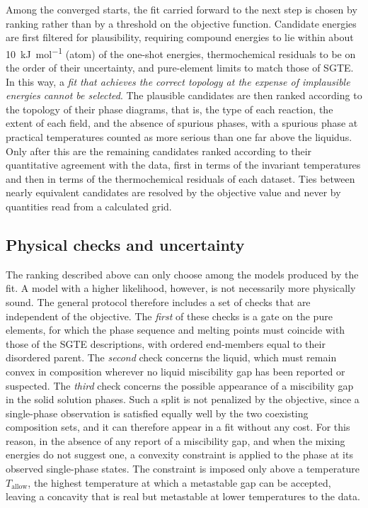 Among the converged starts, the fit carried forward to the next step is chosen by ranking rather than by a threshold on the objective function. Candidate energies are first filtered for plausibility, requiring compound energies to lie within about \qty{10}{\kilo\joule\per\mole} (atom) of the one-shot energies, thermochemical residuals to be on the order of their uncertainty, and pure-element limits to match those of SGTE. In this way, a \emph{fit that achieves the correct topology at the expense of implausible energies cannot be selected}. The plausible candidates are then ranked according to the topology of their phase diagrams, that is, the type of each reaction, the extent of each field, and the absence of spurious phases, with a spurious phase at practical temperatures counted as more serious than one far above the liquidus. Only after this are the remaining candidates ranked according to their quantitative agreement with the data, first in terms of the invariant temperatures and then in terms of the thermochemical residuals of each dataset. Ties between nearly equivalent candidates are resolved by the objective value and never by quantities read from a calculated grid.

\subsection{Physical checks and uncertainty}
\label{sec:methods:checks}
\label{sec:methods:uq}

The ranking described above can only choose among the models produced by the fit. A model with a higher likelihood, however, is not necessarily more physically sound. The general protocol therefore includes a set of checks that are independent of the objective. The \emph{first} of these checks is a gate on the pure elements, for which the phase sequence and melting points must coincide with those of the SGTE descriptions, with ordered end-members equal to their disordered parent. The \emph{second} check concerns the liquid, which must remain convex in composition wherever no liquid miscibility gap has been reported or suspected. The \emph{third} check concerns the possible appearance of a miscibility gap in the solid solution phases. Such a split is not penalized by the objective, since a single-phase observation is satisfied equally well by the two coexisting composition sets, and it can therefore appear in a fit without any cost. For this reason, in the absence of any report of a miscibility gap, and when the mixing energies do not suggest one, a convexity constraint is applied to the phase at its observed single-phase states. The constraint is imposed only above a temperature $T_{\mathrm{allow}}$, the highest temperature at which a metastable gap can be accepted, leaving a concavity that is real but metastable at lower temperatures to the data.

